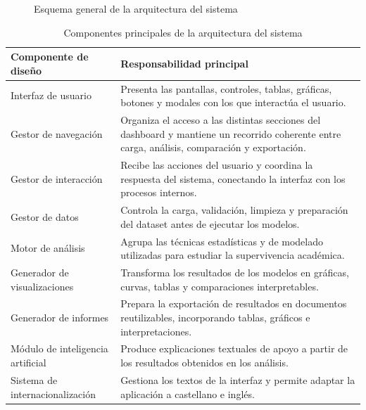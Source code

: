 \begin{figure}[H]
{%
}
\caption{Esquema general de la arquitectura del sistema}
\label{fig:arquitectura_sistema}
\end{figure}

\begin{table}[H]
\centering
\small
\begin{tabular}{|p{}|p{}|}
\hline
\textbf{Componente de diseño} & \textbf{Responsabilidad principal} \\ \hline
Interfaz de usuario & Presenta las pantallas, controles, tablas, gráficas, botones y modales con los que interactúa el usuario. \\ \hline
Gestor de navegación & Organiza el acceso a las distintas secciones del dashboard y mantiene un recorrido coherente entre carga, análisis, comparación y exportación. \\ \hline
Gestor de interacción & Recibe las acciones del usuario y coordina la respuesta del sistema, conectando la interfaz con los procesos internos. \\ \hline
Gestor de datos & Controla la carga, validación, limpieza y preparación del dataset antes de ejecutar los modelos. \\ \hline
Motor de análisis & Agrupa las técnicas estadísticas y de modelado utilizadas para estudiar la supervivencia académica. \\ \hline
Generador de visualizaciones & Transforma los resultados de los modelos en gráficas, curvas, tablas y comparaciones interpretables. \\ \hline
Generador de informes & Prepara la exportación de resultados en documentos reutilizables, incorporando tablas, gráficos e interpretaciones. \\ \hline
Módulo de inteligencia artificial & Produce explicaciones textuales de apoyo a partir de los resultados obtenidos en los análisis. \\ \hline
Sistema de internacionalización & Gestiona los textos de la interfaz y permite adaptar la aplicación a castellano e inglés. \\ \hline
\end{tabular}
\caption{Componentes principales de la arquitectura del sistema}
\label{tab:modulos_sistema}
\end{table}

